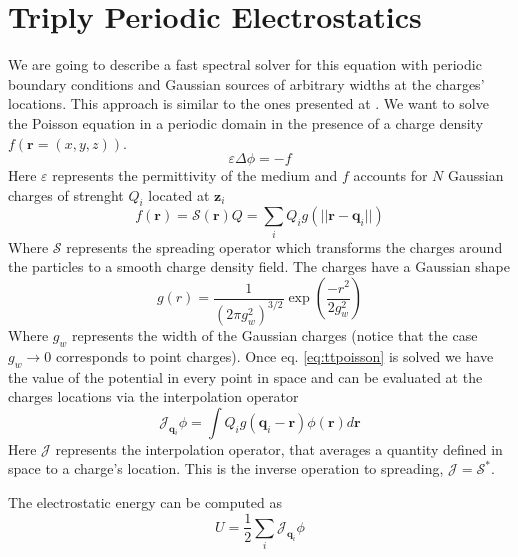 \documentclass[ twoside,openright,titlepage,numbers=noenddot,%
headinclude,footinclude,cleardoublepage=empty,abstract=on,
BCOR=5mm,paper=a4,fontsize=11pt, dvipsnames
]{scrreprt}
\renewcommand{\vec}[1]{\bm{#1}}
\newcommand{\oper}[1]{\mathcal{#1}}
\newcommand{\ppos}{q}
\newcommand{\fpos}{r}
\begin{document}
\section{Triply Periodic Electrostatics} \label{ch:tppoisson}
We are going to describe a fast spectral solver for this equation with periodic boundary conditions and Gaussian sources of arbitrary widths at the charges' locations. This approach is similar to the ones presented at \cite{Lindbo2011,Tornberg2015}.
We want to solve the Poisson equation in a periodic domain in the presence of a charge density $f(\vec{\fpos}=(x,y,z))$.
\begin{equation}
  \label{eq:ttpoisson}
 \varepsilon\Delta\phi=-f
\end{equation}
Here $\varepsilon$ represents the permittivity of the medium and $f$ accounts for $N$ Gaussian charges of strenght $Q_i$ located at $\vec{z}_i$
\begin{equation}
  \label{eq:tppoisson_cdens}
  f(\vec{\fpos})= \oper{S}(\vec{\fpos})Q = \sum_iQ_ig(||\vec{\fpos}-\vec{\ppos}_i||)
\end{equation}
Where $\oper{S}$ represents the spreading operator which transforms the charges around the particles to a smooth charge density field. The charges have a Gaussian shape
\begin{equation}
  \label{eq:tpppoisson_gaussiansource}
 g(r)=\frac{1}{\left(2\pi g_w^2\right)^{3/2}}\exp{\left(\frac{-r^2}{2g_w^2}\right)}
\end{equation}
Where $g_w$ represents the width of the Gaussian charges (notice that the case $g_w\rightarrow 0$ corresponds to point charges).
Once eq. \eqref{eq:ttpoisson} is solved we have the value of the potential in every point in space and can be evaluated at the charges locations via the interpolation operator
\begin{equation}  
  \oper{J}_{\vec{\ppos}_i}\phi = \int Q_ig(\vec{\ppos}_i - \vec{\fpos})\phi(\vec{\fpos})d\vec{\fpos}
\end{equation}
Here $\oper{J}$ represents the interpolation operator, that averages a quantity defined in space to a charge's location. This is the inverse operation to spreading, $\oper{J} = \oper{S}^*$.

The electrostatic energy can be computed as
\begin{equation}
  \label{tppoisson_avgpot}
  U =  \frac{1}{2}\sum_i{\oper{J}_{\vec{\ppos}_i}\phi} 
\end{equation}
\end{document}
